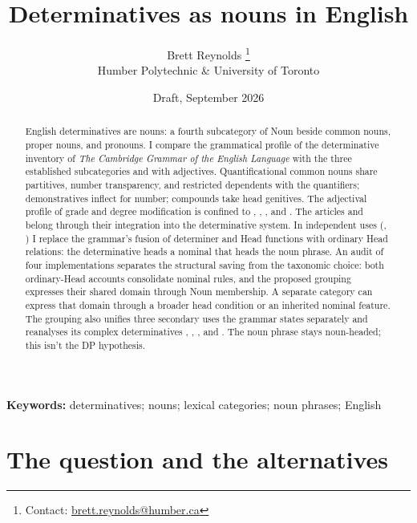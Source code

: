 \documentclass[12pt]{article}
\title{Determinatives as nouns in English}
\author{Brett Reynolds \orcidlink{0000-0003-0073-7195}%
\thanks{Contact: \href{mailto:brett.reynolds@humber.ca}{brett.reynolds@humber.ca}}\\
Humber Polytechnic \& University of Toronto}
\date{Draft, September 2026}
\begin{document}
\maketitle

\begin{abstract}
English determinatives are nouns: a fourth subcategory of Noun beside common nouns, proper nouns, and pronouns. I compare the grammatical profile of the determinative inventory of \textit{The Cambridge Grammar of the English Language} with the three established subcategories and with adjectives. Quantificational common nouns share partitives, number transparency, and restricted dependents with the quantifiers; demonstratives inflect for number; compounds take head genitives. The adjectival profile of grade and degree modification is confined to , , , and . The articles and  belong through their integration into the determinative system. In independent uses (, ) I replace the grammar's fusion of determiner and Head functions with ordinary Head relations: the determinative heads a nominal that heads the noun phrase. An audit of four implementations separates the structural saving from the taxonomic choice: both ordinary-Head accounts consolidate nominal rules, and the proposed grouping expresses their shared domain through Noun membership. A separate category can express that domain through a broader head condition or an inherited nominal feature. The grouping also unifies three secondary uses the grammar states separately and reanalyses its complex determinatives , , , and . The noun phrase stays noun-headed; this isn't the DP hypothesis.
\end{abstract}

\noindent\textbf{Keywords:} determinatives; nouns; lexical categories; noun phrases; English

\par\medskip
{}
\medskip

\section{The question and the alternatives}\label{sec:intro}
\end{document}

